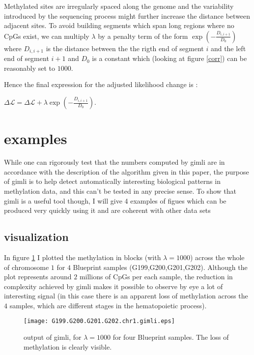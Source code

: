 \documentclass[11pt]{amsart}
\newcommand{\lik}{\ensuremath{\mathcal{L}}}
\begin{document}
Methylated sites are irregularly spaced along the genome and the variability 
introduced by the sequencing process might further increase the distance 
between adjacent sites.
To avoid building segments which span long regions where no CpGs exist, we 
can multiply $\lambda$ by a penalty term of the
form $\exp(-\frac{D_{i,i+1}}{D_0})$ where $D_{i,i+1}$ is the distance 
between the the rigth end of segment $i$ and the left end of segment $i+1$ and 
$D_0$ is a constant which (looking at figure \ref{corr}) can be reasonably 
set to $1000$. 

Hence the final expression for the adjusted likelihood change is :

$\Delta \lik = \Delta \lik+\lambda \exp(-\frac{D_{i,i+1}}{D_0}) $.

\section{examples}

While one can rigorously test that the numbers computed by gimli are in 
accordance with the description
of the algorithm given in this paper, the purpose of gimli is to help 
detect automatically interesting
biological patterns in methylation data, and this can't be tested in any 
precise sense. To show that gimli is a useful tool
though, I will give 4 examples of figues which can be produced very quickly
using it and are coherent with other data sets

\subsection{visualization}

In figure \ref{ex1} I plotted the methylation in blocks (with $\lambda=1000$) 
across the whole of chromosome $1$ for $4$ Blueprint samples
(G199,G200,G201,G202). Although the plot represents around $2$ millions of 
CpGs per each sample, the reduction in complexity achieved by gimli makes it 
possible to observe by eye a lot of interesting signal (in this case there is 
an apparent loss of methylation across the $4$ samples, which are different 
stages in the hematopoietic process).

\begin{figure}\label{ex1}
\texttt{[image: G199.G200.G201.G202.chr1.gimli.eps]}
\caption{output of gimli, for $\lambda=1000$ for four Blueprint samples. The loss of
methylation is clearly visible.}
\end{figure}
\end{document}

